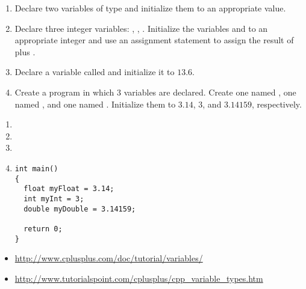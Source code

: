 \begin{enumerate}
	\item Declare two variables of type  and initialize them to an appropriate value.
	\item Declare three integer variables: , , . Initialize the variables  and  to an appropriate integer and use an assignment statement to assign  the result of  plus .
	\item Declare a  variable called  and initialize it to $13.6$.

\item Create a program in which 3 variables are declared.
Create one  named , one  named , and one  named .
Initialize them to $3.14$, $3$, and $3.14159$, respectively. 

\end{enumerate}



\begin{enumerate}
	\item {}
	

	\item	{}
	
 
  \item {}
  \item
  
\noindent\begin{minipage}{\linewidth}\begin{lstlisting}
int main()
{
  float myFloat = 3.14;
  int myInt = 3;
  double myDouble = 3.14159;

  return 0;
}
\end{lstlisting}\end{minipage}

\end{enumerate}


\begin{itemize}
\item \url{http://www.cplusplus.com/doc/tutorial/variables/}
\item \url{http://www.tutorialspoint.com/cplusplus/cpp_variable_types.htm}
\end{itemize}	